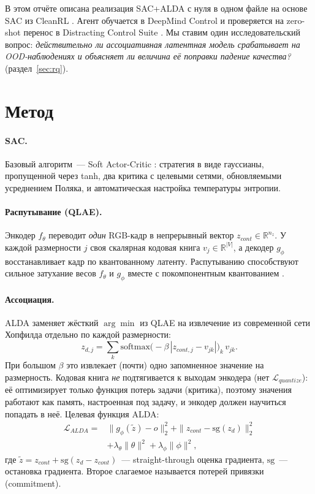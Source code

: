 \documentclass{article}
\theoremstyle{plain}
\theoremstyle{definition}
\theoremstyle{remark}
\begin{document}
В этом отчёте описана реализация SAC+ALDA с нуля в одном файле на основе SAC
из CleanRL \citep{huang2022cleanrl}. Агент обучается в DeepMind Control
\citep{tassa2018dmc} и проверяется на zero-shot перенос в Distracting Control
Suite \citep{stone2021dcs}. Мы ставим один исследовательский вопрос:
\emph{действительно ли ассоциативная латентная модель срабатывает на
OOD-наблюдениях и объясняет ли величина её поправки падение качества?}
(раздел~\ref{sec:rq}).

\section{Метод}
\label{sec:method}

\paragraph{SAC.} Базовый алгоритм~--- Soft Actor-Critic
\citep{haarnoja2018sac}: стратегия в виде гауссианы, пропущенной через tanh,
два критика с целевыми сетями, обновляемыми усреднением Поляка, и
автоматическая настройка температуры энтропии.

\paragraph{Распутывание (QLAE).} Энкодер $f_\theta$ переводит \emph{один}
RGB-кадр в непрерывный вектор $z_{cont}\in\mathbb{R}^{n_z}$. У каждой
размерности $j$ своя скалярная кодовая книга $v_j\in\mathbb{R}^{|V|}$, а
декодер $g_\phi$ восстанавливает кадр по квантованному латенту. Распутыванию
способствуют сильное затухание весов $f_\theta$ и $g_\phi$ вместе с
покомпонентным квантованием \citep{hsu2023qlae}.

\paragraph{Ассоциация.} ALDA заменяет жёсткий $\arg\min$ из QLAE на
извлечение из современной сети Хопфилда \citep{ramsauer2020hopfield}
отдельно по каждой размерности:
\begin{equation}
  z_{d,j} = \textstyle\sum_k \mathrm{softmax}\big(-\beta\,|z_{cont,j}-v_{jk}|\big)_k\, v_{jk}.
  \label{eq:assoc}
\end{equation}
При большом $\beta$ это извлекает (почти) одно запомненное значение на
размерность. Кодовая книга \emph{не} подтягивается к выходам энкодера (нет
$\mathcal{L}_{quantize}$): её оптимизирует только функция потерь задачи
(критика), поэтому значения работают как память, настроенная под задачу, и
энкодер должен научиться попадать в неё. Целевая функция ALDA:
\begin{equation}
  \begin{aligned}
  \mathcal{L}_{ALDA} = {} & \|g_\phi(\tilde z) - o\|_2^2 + \|z_{cont} - \mathrm{sg}(z_d)\|_2^2 \\
  & + \lambda_\theta\|\theta\|^2 + \lambda_\phi\|\phi\|^2,
  \end{aligned}
\end{equation}
где $\tilde z = z_{cont} + \mathrm{sg}(z_d - z_{cont})$~--- straight-through
оценка градиента, $\mathrm{sg}$~--- остановка градиента. Второе слагаемое
называется потерей привязки (commitment).
\end{document}
